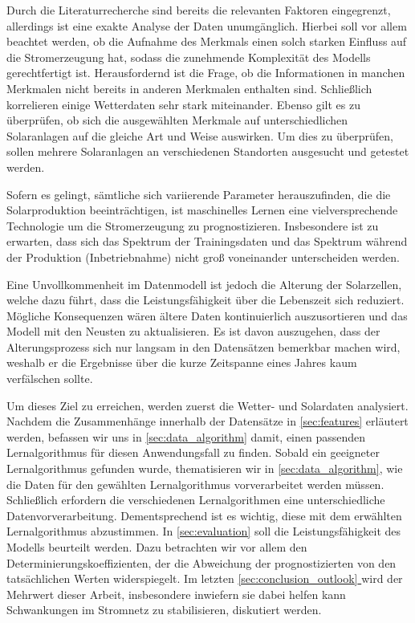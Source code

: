 \documentclass[12pt, a4paper]{article}
\newcommand*{\fullref}[1]{\hyperref[{#1}]{\autoref*{#1} \textit{\nameref*{#1}}}}
\begin{document}
Durch die Literaturrecherche sind bereits die relevanten Faktoren eingegrenzt, allerdings ist eine exakte Analyse der Daten unumgänglich. Hierbei soll vor allem beachtet werden, ob die Aufnahme des Merkmals einen solch starken Einfluss auf die Stromerzeugung hat, sodass die zunehmende Komplexität des Modells gerechtfertigt ist. Herausfordernd ist die Frage, ob die Informationen in manchen Merkmalen nicht bereits in anderen Merkmalen enthalten sind. Schließlich korrelieren einige Wetterdaten sehr stark miteinander. Ebenso gilt es zu überprüfen, ob sich die ausgewählten Merkmale auf unterschiedlichen Solaranlagen auf die gleiche Art und Weise auswirken. Um dies zu überprüfen, sollen mehrere Solaranlagen an verschiedenen Standorten ausgesucht und getestet werden.

Sofern es gelingt, sämtliche sich variierende Parameter herauszufinden, die die Solarproduktion beeinträchtigen, ist maschinelles Lernen eine vielversprechende Technologie um die Stromerzeugung zu prognostizieren. Insbesondere ist zu erwarten, dass sich das Spektrum der Trainingsdaten und das Spektrum während der Produktion (Inbetriebnahme) nicht groß voneinander unterscheiden werden.

Eine Unvollkommenheit im Datenmodell ist jedoch die Alterung der Solarzellen, welche dazu führt, dass die Leistungsfähigkeit über die Lebenszeit sich reduziert. Mögliche Konsequenzen wären ältere Daten kontinuierlich auszusortieren und das Modell mit den Neusten zu aktualisieren. Es ist davon auszugehen, dass der Alterungsprozess sich nur langsam in den Datensätzen bemerkbar machen wird, weshalb er die Ergebnisse über die kurze Zeitspanne eines Jahres kaum verfälschen sollte.

Um dieses Ziel zu erreichen, werden zuerst die Wetter- und Solardaten analysiert. Nachdem die Zusammenhänge innerhalb der Datensätze in \autoref{sec:features} erläutert werden, befassen wir uns in \autoref{sec:data_algorithm} damit, einen passenden Lernalgorithmus für diesen Anwendungsfall zu finden. Sobald ein geeigneter Lernalgorithmus gefunden wurde, thematisieren wir in \autoref{sec:data_algorithm}, wie die Daten für den gewählten Lernalgorithmus vorverarbeitet werden müssen. Schließlich erfordern die verschiedenen Lernalgorithmen eine unterschiedliche Datenvorverarbeitung. Dementsprechend ist es wichtig, diese mit dem erwählten Lernalgorithmus abzustimmen. In \autoref{sec:evaluation} soll die Leistungsfähigkeit des Modells beurteilt werden. Dazu betrachten wir vor allem den Determinierungskoeffizienten, der die Abweichung der prognostizierten von den tatsächlichen Werten widerspiegelt. Im letzten \fullref{sec:conclusion_outlook} wird der Mehrwert dieser Arbeit, insbesondere inwiefern sie dabei helfen kann Schwankungen im Stromnetz zu stabilisieren, diskutiert werden.
 
\end{document}
